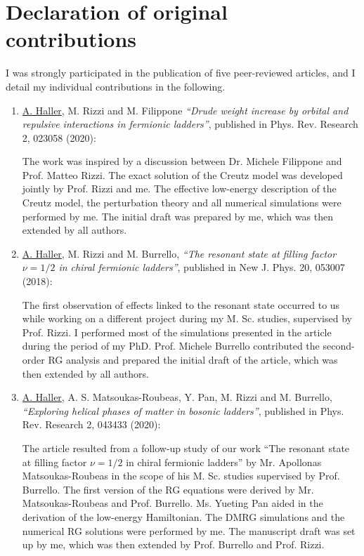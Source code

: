 \chapter{Declaration of original contributions}
\label{ch:declaration_of_original_contributions}
I was strongly participated in the publication of five peer-reviewed articles, and I detail my individual contributions in the following.\bigskip

\begin{enumerate}
    \item{\underline{A. Haller}, M. Rizzi and M. Filippone {\it ``Drude weight increase by orbital and repulsive interactions in fermionic ladders''}, published in Phys. Rev. Research 2, 023058 (2020):
    
    The work was inspired by a discussion between Dr. Michele Filippone and Prof. Matteo Rizzi. The exact solution of the Creutz model was developed jointly by Prof. Rizzi and me. 
    The effective low-energy description of the Creutz model, the perturbation theory and all numerical simulations were performed by me. The initial draft was prepared by me, which was then extended by all authors.}\bigskip
    
    \item{\underline{A. Haller}, M. Rizzi and M. Burrello, {\it ``The resonant state at filling factor $\nu=1/2$ in chiral fermionic ladders''}, published in New J. Phys. 20, 053007 (2018): 
    
    The first observation of effects linked to the resonant state occurred to us while working on a different project during my M. Sc. studies, supervised by Prof. Rizzi. I performed most of the simulations presented in the article during the period of my PhD. Prof. Michele Burrello contributed the second-order RG analysis and prepared the initial draft of the article, which was then extended by all authors.}\bigskip
    
    \item{\underline{A. Haller}, A. S. Matsoukas-Roubeas, Y. Pan, M. Rizzi and M. Burrello, {\it ``Exploring helical phases of matter in bosonic ladders''}, published in Phys. Rev. Research 2, 043433 (2020):
    
    The article resulted from a follow-up study of our work ``The resonant state at filling factor $\nu=1/2$ in chiral fermionic ladders'' by Mr. Apollonas Matsoukas-Roubeas in the scope of his M. Sc. studies supervised by Prof. Burrello. The first version of the RG equations were derived by Mr. Matsoukas-Roubeas and Prof. Burrello. Ms. Yueting Pan aided in the derivation of the low-energy Hamiltonian. The DMRG simulations and the numerical RG solutions were performed by me. The manuscript draft was set up by me, which was then extended by Prof. Burrello and Prof. Rizzi.}
    \newpage
    

\end{enumerate}
